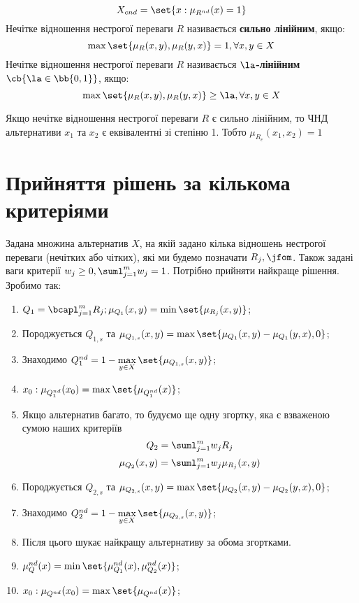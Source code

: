 \begin{equation}
X_{cnd} = \set{x:\mu_{R^{nd}}(x)=1}
\end{equation}
Нечітке відношення нестрогої переваги $R$ називається \textbf{сильно лінійним}, якщо:
\begin{equation}
\max\set{\mu_R(x,y),\mu_R(y,x)}=1,\forall x,y\in X
\end{equation}
Нечітке відношення нестрогої переваги $R$ називається \textbf{$\la$-лінійним} $\cb{\la\in\bb{0,1}}$, якщо:
\begin{equation}
\max\set{\mu_R(x,y),\mu_R(y,x)}\geq\la,\forall x,y\in X
\end{equation}
\begin{teor}
Якщо нечітке відношення нестрогої переваги $R$ є сильно лінійним, то ЧНД альтернативи $x_1$ та $x_2$ є еквівалентні зі степіню 1. Тобто $\mu_{R_e}(x_1,x_2) = 1$
\end{teor}
\section{Прийняття рішень за кількома критеріями}
Задана множина альтернатив $X$, на якій задано кілька відношень нестрогої переваги (нечітких або чітких), які ми будемо позначати $R_j,\jfom$. Також задані ваги критерії $w_j\geq 0,\suml_{j=1}^m w_j = 1$. Потрібно прийняти найкраще рішення.\\
Зробимо так:
\begin{enumerate}
\item $Q_1 = \bcapl_{j=1}^m R_j;\mu_{Q_1}(x,y) = \min\set{\mu_{R_j}(x,y)}$;
\item Породжується $Q_{1,s}$ та $\mu_{Q_{1,s}}(x,y) = \max\set{\mu_{Q_1}(x,y) -\mu_{Q_1}(y,x),0}$;
\item Знаходимо $Q_1^{nd} = 1-\max\limits_{y\in X}\set{\mu_{Q_{1,s}}(x,y)}$;
\item $x_0:\mu_{Q_1^{nd}}(x_0) = \max\set{\mu_{Q_1^{nd}}(x)}$;
\item Якщо альтернатив багато, то будуємо ще одну згортку, яка є взваженою сумою наших критеріїв
\begin{equation}
Q_2 = \suml_{j=1}^m w_jR_j
\end{equation}
\begin{equation}
\mu_{Q_2}(x,y) = \suml_{j=1}^m w_j\mu_{R_j}(x,y)
\end{equation}
\item Породжується $Q_{2,s}$ та $\mu_{Q_{2,s}}(x,y) = \max\set{\mu_{Q_2}(x,y) -\mu_{Q_2}(y,x),0}$;
\item Знаходимо $Q_2^{nd} = 1-\max\limits_{y\in X}\set{\mu_{Q_{2,s}}(x,y)}$;
\item Після цього шукає найкращу альтернативу за обома згортками.
\item $\mu_Q^{nd}(x) = \min\set{\mu_{Q_1}^{nd}(x),\mu_{Q_2}^{nd}(x)}$;
\item $x_0:\mu_{Q^{nd}}(x_0) = \max\set{\mu_{Q^{nd}}(x)}$;
\end{enumerate}
